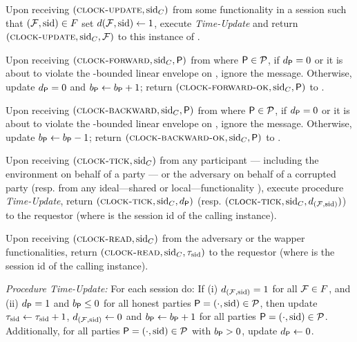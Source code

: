\begin{cccFunctionality}
\begin{cccItemize}[nosep]
        \item Upon receiving $(\textsc{clock-update}, \mathrm{sid}_C)$ from some functionality \F in a session \sid such that $(\mathcal{F}, \mathrm{sid}) \in F$ set $d(\mathcal{F}, \mathrm{sid}) \gets 1$, execute \emph{Time-Update} and return $(\textsc{clock-update},\allowbreak \mathrm{sid}_C, \mathcal{F})$ to this instance of \F.

        \item Upon receiving $(\textsc{clock-forward}, \mathrm{sid}_C , \mathsf{P})$ from \adv where $\mathsf{P} \in \mathcal{P}$, if $d_\mathsf{P} = 0$ or it is about to violate the \clockDrift-bounded linear envelope on \party, ignore the message.
        Otherwise, update $d_\mathsf{P} = 0$ and $b_\mathsf{P} \gets b_\mathsf{P} + 1$; return $(\textsc{clock-forward-ok}, \mathrm{sid}_C , \mathsf{P})$ to \adv.

        \item Upon receiving $(\textsc{clock-backward}, \mathrm{sid}_C , \mathsf{P})$ from \adv where $\mathsf{P} \in \mathcal{P}$, if $d_\mathsf{P} = 0$ or it is about to violate the \clockDrift-bounded linear envelope on \party, ignore the message.
        Otherwise, update $b_\mathsf{P} \gets b_\mathsf{P} - 1$; return $(\textsc{clock-backward-ok}, \mathrm{sid}_C , \mathsf{P})$ to \adv.

        \item Upon receiving $(\textsc{clock-tick}, \mathrm{sid}_C)$ from any participant \party --- including the environment on behalf of a party --- or the adversary on behalf of a corrupted party \party (resp. from any ideal---shared or local---functionality \F), execute procedure \textit{Time-Update}, return $(\textsc{clock-tick}, \mathrm{sid}_C, d_{\mathsf{P}})$ (resp. $(\textsc{clock-tick}, \mathrm{sid}_C, d_{(\mathcal{F}, \mathrm{sid})})$) to the requestor (where \sid is the session id of the calling instance).

        \item Upon receiving $(\textsc{clock-read}, \mathrm{sid}_C)$ from the adversary or the wapper functionalities, return $(\textsc{clock-read},\mathrm{sid}_C, \tau_{\mathrm{sid}})$ to the requestor (where \sid is the session id of the calling instance).
    \end{cccItemize}

    \medskip\emph{Procedure Time-Update:}
    For each session \sid do: If (i) $d_{(\mathcal{F}, \mathrm{sid})} = 1$ for all $\mathcal{F} \in F$, and (ii) $d_\mathsf{P} = 1$ and $b_\mathsf{P} \le 0$ for all honest parties $\mathsf{P} = (\cdot, \mathrm{sid}) \in \mathcal{P}$, then update $\tau_\mathrm{sid} \gets \tau_\mathrm{sid} + 1$, $d_{(\mathcal{F},\mathrm{sid})} \gets 0$ and $b_\mathsf{P} \gets b_\mathsf{P} + 1$ for all parties $\mathsf{P} = (\cdot, \mathrm{sid}) \in \mathcal{P}$.
    Additionally, for all parties $\mathsf{P} = (\cdot, \mathrm{sid}) \in \mathcal{P}$ with $b_\mathsf{P} > 0$, update $d_\mathsf{P} \gets 0$.
\end{cccFunctionality}

